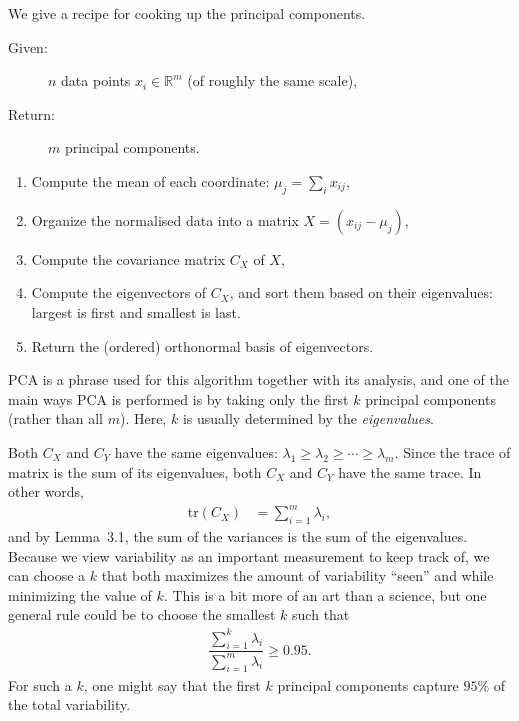 \documentclass[a4paper, 12pt]{article}
\numberwithin{equation}{section}
\numberwithin{figure}{section}
\theoremstyle{definition}
\newtheorem{quest}[thm]{Question}
\renewcommand{\geq}{\geqslant}
\newcommand{\R}{\mathbb{R}}
\begin{document}
\medskip

We give a recipe for cooking up the principal components.
\begin{description}
	\item[Given:] $n$ data points $x_i\in\R^m$ (of roughly the same scale),
	\item[Return:] $m$ principal components.
\end{description}
\begin{enumerate}
	\item Compute the mean of each coordinate: $\mu_j = \sum_i x_{ij}$,
	\item Organize the normalised data into a matrix $X = (x_{ij} - \mu_j)$,
	\item Compute the covariance matrix $C_X$ of $X$,
	\item Compute the eigenvectors of $C_X$, and sort them based on their
	eigenvalues: largest is first and smallest is last.
	\item Return the (ordered) orthonormal basis of eigenvectors. 
\end{enumerate}

PCA is a phrase used for this algorithm together with its analysis, and one of
the main ways PCA is performed is by taking only the first $k$ principal
components (rather than all $m$). Here, $k$ is usually determined by the
\textit{eigenvalues}. 

Both $C_X$ and $C_Y$ have the same eigenvalues: $\lambda_1 \geq \lambda_2 \geq
\cdots \geq \lambda_m$. Since the trace of matrix is the sum of its eigenvalues,
both $C_X$ and $C_Y$ have the same trace. In other words, 
\begin{align*}
	\mathrm{tr}(C_X) &= \sum_{i=1}^m \lambda_i,
\end{align*}
and by Lemma~3.1, the sum of the variances is the sum of
the eigenvalues. Because we view variability as an important measurement to keep
track of, we can choose a $k$ that both maximizes the amount of variability
``seen'' and while minimizing the value of $k$. This is a bit more of an art
than a science, but one general rule could be to choose the smallest $k$ such
that 
\begin{align} \label{eqn:k-rule}
	\dfrac{\sum_{i=1}^k\lambda_i}{\sum_{i=1}^m\lambda_i} \geq 0.95.
\end{align} 
For such a $k$, one might say that the first $k$ principal components capture
$95\%$ of the total variability.

\end{document}
